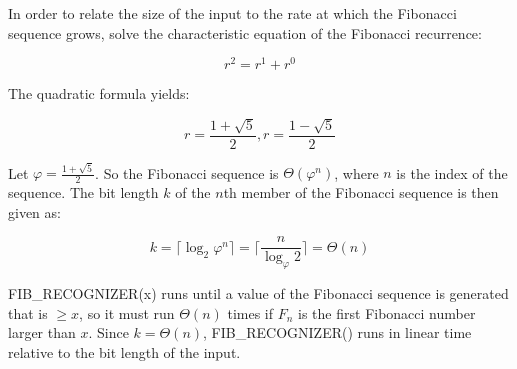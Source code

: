 \documentclass{article}
\begin{document}
In order to relate the size of the input to the rate at which the Fibonacci
sequence grows, solve the characteristic equation of the Fibonacci recurrence:

\[
r^2 = r^1 + r^0
\]

The quadratic formula yields:

\[
r = \frac{1+\sqrt{5}}{2}, r = \frac{1-\sqrt{5}}{2}
\]

Let $\varphi = \frac{1+\sqrt{5}}{2}$.
So the Fibonacci sequence is $\Theta(\varphi^n)$, where $n$ is
the index of the sequence. The bit length $k$ of the $n$th member of the
Fibonacci sequence is then given as:

\[
k = \lceil \log_2 \varphi ^n \rceil = 
\lceil \frac{n}{\log_\varphi 2} \rceil =
\Theta(n)
\]

FIB\_RECOGNIZER(x) runs until a value of the Fibonacci sequence is generated
that is $\ge x$, so it must run $\Theta(n)$ times if $F_n$ is the first
Fibonacci
number larger than $x$. Since $k = \Theta(n)$, FIB\_RECOGNIZER() runs in
linear time relative to the bit length of the input.
\end{document}
